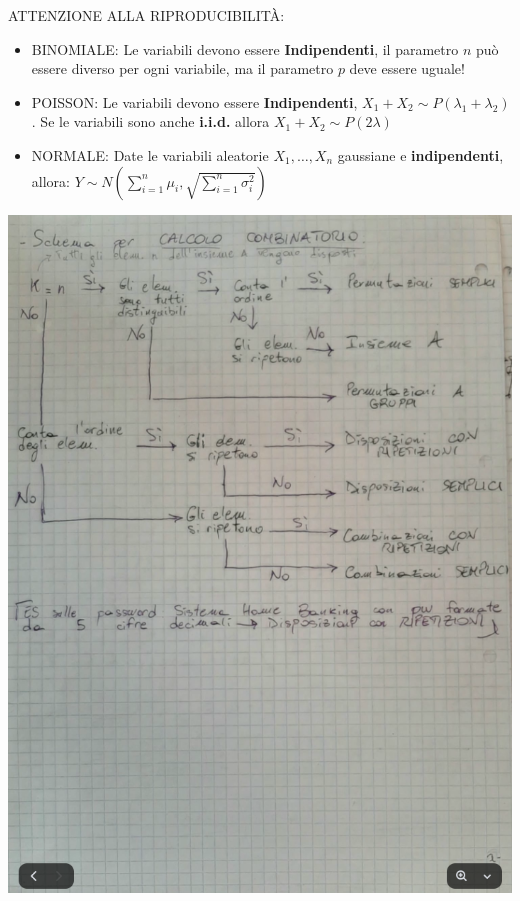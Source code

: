 \documentclass{article}
\begin{document}
\pagebreak

ATTENZIONE ALLA RIPRODUCIBILITÀ: 
\begin{itemize}
    \item BINOMIALE: Le variabili devono essere \textbf{Indipendenti}, il parametro $n$ può essere diverso per ogni variabile, ma il parametro $p$ deve essere uguale!
    \item POISSON: Le variabili devono essere \textbf{Indipendenti}, $X_1 + X_2 \sim P(\lambda_1 + \lambda_2)$. Se le variabili sono anche \textbf{i.i.d.} allora $X_1 + X_2 \sim P(2\lambda)$
    \item NORMALE: Date le variabili aleatorie $X_1, \dots, X_n$ gaussiane e \textbf{indipendenti}, allora: $Y \sim N(\sum_{i = 1}^{n}\mu_i , \sqrt{\sum_{i=1}^{n}\sigma_i^2})$
\end{itemize}

\begin{center}
\includegraphics[width=1\linewidth]{./immagini/schemaCombinatorio.png}
\end{center}
\end{document}
